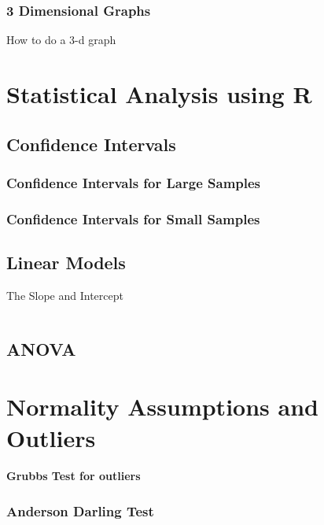 \documentclass[a4paper,12pt]{article}
\begin{document}
\begin{itemize}
\subsection{3 Dimensional Graphs}
How to do a 3-d graph

\newpage
\chapter{Statistical Analysis using R}
\section{Confidence Intervals}
\subsection{Confidence Intervals for Large Samples}
\subsection{Confidence Intervals for Small Samples}

\section{Linear Models}

The Slope and Intercept
\begin{myindentpar}{1cm}
\begin{verbatim}

\end{verbatim}
\end{myindentpar}

\section{ANOVA}


\newpage
\chapter{Normality Assumptions and Outliers}
\subsubsection{Grubbs Test for outliers}
\subsection{Anderson Darling Test}

\end{itemize}
\end{document}
